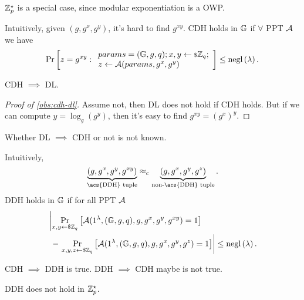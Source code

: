 $\Integers_p^{\star}$ is a special case, since modular exponentiation is a \ac{OWP}.

\begin{definition}
	Intuitively, given $(g, g^x, g^y)$, it's hard to find $g^{xy}$.
	\ac{CDH} holds in $\Group$ if $\forall$ \ac{PPT} $\Adv$ we have
	\begin{equation*}
		\Pr{
			z = g^{xy} :
			\begin{array}{l}
				\params = \GroupTuple ; x, y \rand{\Integers_q} ; \\
				z \from \Adv(\params, g^x, g^y)
			\end{array}
		}
		\le \negl{\lambda}. \qedhere
	\end{equation*}
\end{definition}

\begin{observation} \label{obs:cdh-dl}
	\ac{CDH} $\implies$ \ac{DL}.
\end{observation}

\begin{proof}[Proof of \cref{obs:cdh-dl}]
	Assume not, then \ac{DL} does not hold if \ac{CDH} holds.
	But if we can compute $y = \log_g(g^y)$, then it's easy to find $g^{xy} = (g^x)^y$.
\end{proof}
Whether \ac{DL} $\implies$ \ac{CDH} or not is not known.

\begin{definition}
	Intuitively,
	\begin{equation*}
		\underbrace{(g, g^x, g^y, g^{xy})}_{\text{\acs{DDH} tuple}} \CompInd \underbrace{(g, g^x, g^y, g^z)}_{\text{non-\acs{DDH} tuple}}.
	\end{equation*}
	\ac{DDH} holds in $\Group$ if for all \ac{PPT} $\Adv$
	\begin{align*}
		& \left|
			\Pr[x, y \rand{\Integers_q}]{\Adv(1^{\lambda}, \GroupTuple, g, g^x, g^y, g^{xy}) = 1}
		\right. \\
			&~-
		\left.
			\Pr[x, y,z \rand{\Integers_q}]{\Adv(1^{\lambda}, \GroupTuple, g, g^x, g^y, g^z) = 1}
		\right|
		\le \negl{\lambda}.
	\end{align*}
\end{definition}

\begin{observation}
	\ac{CDH} $\implies$ \ac{DDH} is true.
	\ac{DDH} $\implies$ \ac{CDH} maybe is not true.
\end{observation}

\begin{proposition} \label{prop:ddh-not-zp}
	\ac{DDH} does not hold in $\Integers_p^{\star}$.
\end{proposition}

